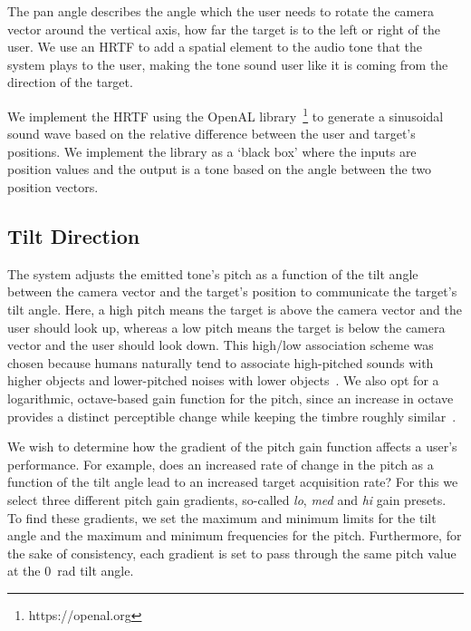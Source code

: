 \documentclass[format=sigconf, review=true, screen=true, anonymous=true]{acmart}
\begin{document}
The pan angle describes the angle which the user needs to rotate the camera vector around the vertical axis, how far the target is to the left or right of the user. We use an HRTF to add a spatial element to the audio tone that the system plays to the user, making the tone sound user like it is coming from the direction of the target. 

We implement the HRTF using the OpenAL library~\footnote{https://openal.org} to generate a sinusoidal sound wave based on the relative difference between the user and target's positions. We implement the library as a `black box' where the inputs are position values and the output is a tone based on the angle between the two position vectors. 



\subsection{Tilt Direction}

The system adjusts the emitted tone's pitch as a function of the tilt angle between the camera vector and the target's position to communicate the target's tilt angle. Here, a high pitch means the target is above the camera vector and the user should look up, whereas a low pitch means the target is below the camera vector and the user should look down. This high/low association scheme was chosen because humans naturally tend to associate high-pitched sounds with higher objects and lower-pitched noises with lower objects~\cite{pratt1930spatial}. We also opt for a logarithmic, octave-based gain function for the pitch, since an increase in octave provides a distinct perceptible change while keeping the timbre roughly similar~\cite{shepard1964circularity}.

We wish to determine how the gradient of the pitch gain function affects a user's performance. For example, does an increased rate of change in the pitch as a function of the tilt angle lead to an increased target acquisition rate? For this we select three different pitch gain gradients, so-called \emph{lo}, \emph{med} and \emph{hi} gain presets. To find these gradients, we set the maximum and minimum limits for the tilt angle and the maximum and minimum frequencies for the pitch. Furthermore, for the sake of consistency, each gradient is set to pass through the same pitch value at the \SI{0}{\radian} tilt angle.   
\end{document}
